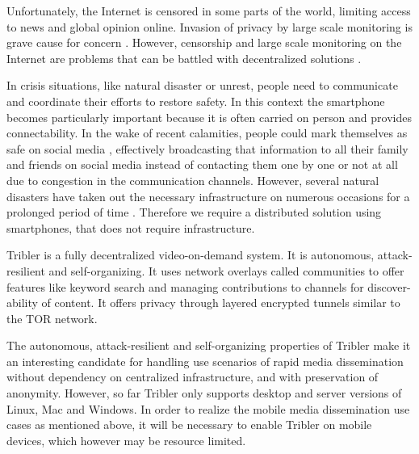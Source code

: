 Unfortunately, the Internet is censored in some parts of the world, limiting access to news and global opinion online.
Invasion of privacy by large scale monitoring is grave cause for concern \cite{nsa_privacy}.
However, censorship and large scale monitoring on the Internet are problems that can be battled with decentralized solutions \cite{pouwelse2012censorshipfree}.


In crisis situations, like natural disaster or unrest, people need to communicate and coordinate their efforts to restore safety.
In this context the smartphone becomes particularly important because it is often carried on person and provides connectability.
In the wake of recent calamities, people could mark themselves as safe on social media \cite{fb-safety-check}, effectively broadcasting that information to all their family and friends on social media instead of contacting them one by one or not at all due to congestion in the communication channels.
However, several natural disasters have taken out the necessary infrastructure on numerous occasions for a prolonged period of time \cite{renesys2005katrina}.
Therefore we require a distributed solution using smartphones, that does not require infrastructure.



Tribler is a fully decentralized video-on-demand system. \cite{TriblerOverviewJournal, tribler2014play, tribler-anon-hd}
It is autonomous, attack-resilient and self-organizing. \cite{votecast, tribler-gossip}
It uses network overlays called communities to offer features like keyword search and managing contributions to channels for discover-ability of content.
It offers privacy through layered encrypted tunnels similar to the TOR network.\cite{tor_bittorrent, tribler2014at3, dingledine2004tor, dingledine2006design}

The autonomous, attack-resilient and self-organizing properties of Tribler make it an interesting candidate for handling use scenarios of rapid media dissemination without dependency on centralized infrastructure, and with preservation of anonymity.
However, so far Tribler only supports desktop and server versions of Linux, Mac and Windows.
In order to realize the mobile media dissemination use cases as mentioned above, it will be necessary to enable Tribler on mobile devices, which however may be resource limited.



